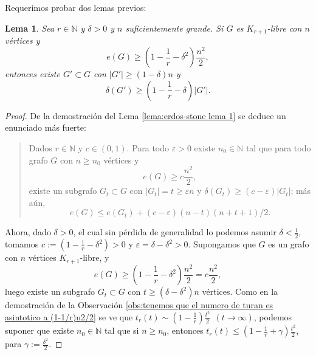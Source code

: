 \documentclass[12pt]{report}
\theoremstyle{plain}
\newtheorem{lemma}[theorem]{Lema}
\theoremstyle{definition}
\newcommand{\naturals}{\mathbb{N}}
\newcommand{\abs}[1]{\left \vert #1 \right \vert}
\begin{document}
Requerimos probar dos lemas previos:

\begin{lemma}\label{lemma: Teorema de Estabilidad de Erdos-simonovits - lema 1}
Sea $r \in \naturals$ y $\delta > 0$ y $n$ suficientemente grande. Si $G$ es $K_{r+1}$-libre con $n$ vértices y
\[
    e(G) \geq \left ( 1 - \frac 1 r - \delta^2\right) \frac{n^2}2,
\]
entonces existe $G' \subset G$ con $\abs{G'} \geq (1 - \delta)n $ y
\[
    \delta (G') \geq \left ( 1 - \frac 1 r - \delta \right) \abs { G'}.
\]
\end{lemma}
\begin{proof}
De la demostración del Lema \ref{lema:erdos-stone lema 1} se deduce un enunciado más fuerte:
\begin{quote}
Dados $r \in \naturals$ y $c\in (0,1)$. Para todo $\varepsilon > 0$ existe $n_0 \in \naturals$ tal que para todo grafo $G$ con $n \geq n_0$ vértices y
\[
    e(G) \geq c \frac{n^2}{2},
\]
existe un subgrafo $G_{t} \subset G$ con $\abs {G_t} = t \geq \varepsilon n$ y $\delta (G_t) \geq (c- \varepsilon) \abs{G_t}$; más aún,
\[
    e(G) \leq e(G_t) + (c- \varepsilon) (n-t) (n+t+1)/2.
\]
\end{quote}

Ahora, dado $\delta > 0$, el cual sin pérdida de generalidad lo podemos asumir $\delta < \frac 1 2$, tomamos $c := \left ( 1 - \frac 1 r - \delta^2 \right ) > 0$ y $\varepsilon = \delta - \delta^2>0$. Supongamos que $G$ es un grafo con $n$ vértices $K_{r+1}$-libre, y
\[
    e(G) \geq \left ( 1 - \frac 1 r - \delta^2 \right ) \frac{n^2}{2} = c \frac {n^2}{2},
\]
luego existe un subgrafo $G_t \subset G$ con $t \geq (\delta - \delta^2) n$ vértices. Como en la demostración de la Observación \ref{obs:tenemos que el numero de turan es asintotico a (1-1/r)n2/2} se ve que $t_r (t) \sim  \left ( 1 - \frac 1 r \right) \frac{t^2}{2} \:\: (t \to \infty)$, podemos suponer que existe $n_0 \in \naturals$ tal que si $n \geq n_0$, entonces $t_r (t) \leq \left ( 1 - \frac 1 r + \gamma \right ) \frac{t^2}{2}$, para $\gamma := \frac{\delta^2}{2}$.


\end{proof}
\end{document}
